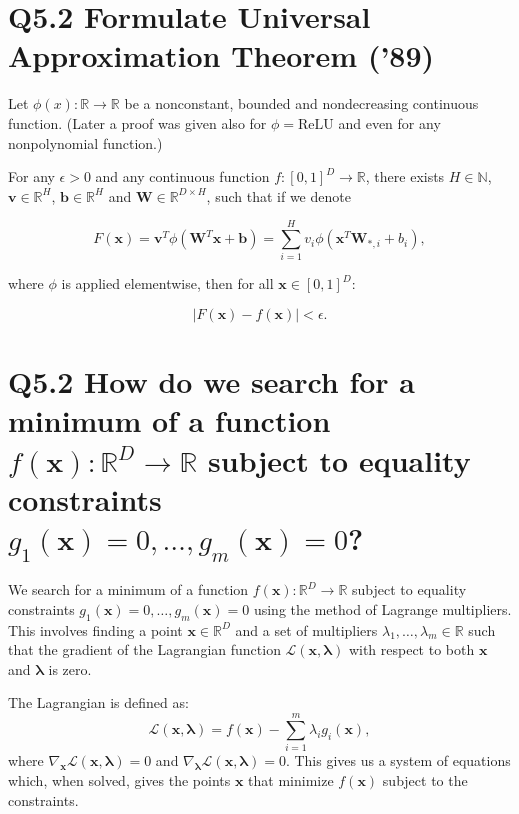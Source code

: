 \documentclass[11pt]{article}
\begin{document}
\section*{Q5.2 Formulate Universal Approximation Theorem ('89)}

Let \(\phi(x) : \mathbb{R} \rightarrow \mathbb{R}\) be a nonconstant, bounded and nondecreasing continuous function. (Later a proof was given also for \(\phi = \text{ReLU}\) and even for any nonpolynomial function.)

For any \(\epsilon > 0\) and any continuous function \(f : [0, 1]^D \rightarrow \mathbb{R}\), there exists \(H \in \mathbb{N}\), \(\mathbf{v} \in \mathbb{R}^H\), \(\mathbf{b} \in \mathbb{R}^H\) and \(\mathbf{W} \in \mathbb{R}^{D \times H}\), such that if we denote

\[
F(\mathbf{x}) = \mathbf{v}^T \phi(\mathbf{W}^T \mathbf{x} + \mathbf{b}) = \sum_{i=1}^{H} v_i \phi(\mathbf{x}^T \mathbf{W}_{*,i} + b_i),
\]

where \(\phi\) is applied elementwise, then for all \(\mathbf{x} \in [0, 1]^D\):

\[
\left| F(\mathbf{x}) - f(\mathbf{x}) \right| < \epsilon.
\]

\section{Q5.2 How do we search for a minimum of a function $f(\mathbf{x}) : \mathbb{R}^D \rightarrow \mathbb{R}$ subject to equality constraints $g_1(\mathbf{x}) = 0, \ldots, g_m(\mathbf{x}) = 0$?}

We search for a minimum of a function $f(\mathbf{x}) : \mathbb{R}^D \rightarrow \mathbb{R}$ subject to equality constraints $g_1(\mathbf{x}) = 0, \ldots, g_m(\mathbf{x}) = 0$ using the method of Lagrange multipliers. This involves finding a point $\mathbf{x} \in \mathbb{R}^D$ and a set of multipliers $\lambda_1, \ldots, \lambda_m \in \mathbb{R}$ such that the gradient of the Lagrangian function $\mathcal{L}(\mathbf{x}, \mathbf{\lambda})$ with respect to both $\mathbf{x}$ and $\mathbf{\lambda}$ is zero.

The Lagrangian is defined as:
\[
\mathcal{L}(\mathbf{x}, \mathbf{\lambda}) = f(\mathbf{x}) - \sum_{i=1}^{m} \lambda_i g_i(\mathbf{x}),
\]
where $\nabla_{\mathbf{x}}\mathcal{L}(\mathbf{x}, \mathbf{\lambda}) = 0$ and $\nabla_{\mathbf{\lambda}}\mathcal{L}(\mathbf{x}, \mathbf{\lambda}) = 0$. This gives us a system of equations which, when solved, gives the points $\mathbf{x}$ that minimize $f(\mathbf{x})$ subject to the constraints.
\end{document}
